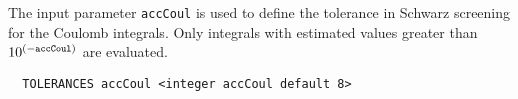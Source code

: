 
%

The input
parameter {\tt accCoul} is used to define the tolerance in Schwarz 
screening for the Coulomb integrals.  Only integrals with estimated
values greater than $10^{(-{\tt accCoul})}$ are evaluated.

\begin{verbatim}
  TOLERANCES accCoul <integer accCoul default 8>
\end{verbatim}


